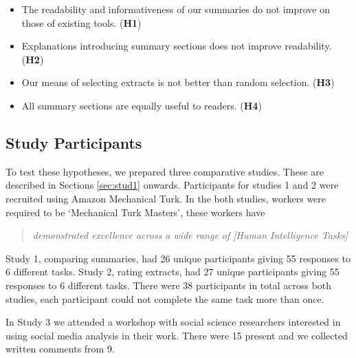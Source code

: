     \begin{itemize}
      \item{The readability and informativeness of our summaries do not improve on those of existing tools. (\textbf{H1})}
      \item{Explanations introducing summary sections does not improve readability. (\textbf{H2})}
      \item{Our means of selecting extracts is not better than random selection. (\textbf{H3})}
      \item{All summary sections are equally useful to readers. (\textbf{H4})}
    \end{itemize}

    \tocless\subsection{Study Participants}
      To test these hypotheses, we prepared three comparative studies. These are described in Sections \ref{sec:stud1} onwards. Participants for studies 1 and 2 were recruited using Amazon Mechanical Turk. In the both studies, workers were required to be `Mechanical Turk Masters', these workers have \blockquote{\textit{demonstrated excellence across a wide range of [Human Intelligence Tasks]}}. Study 1, comparing summaries, had 26 unique participants giving 55 responses to 6 different tasks. Study 2, rating extracts, had 27 unique participants giving 55 responses to 6 different tasks. There were 38 participants in total across both studies, each participant could not complete the same task more than once.

      In Study 3 we attended a workshop with social science researchers interested in using social media analysis in their work. There were 15 present and we collected written comments from 9.


